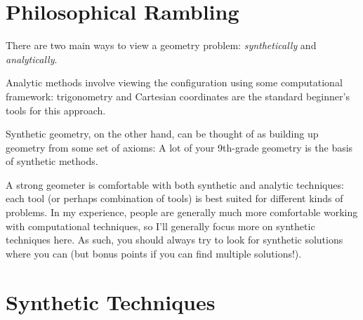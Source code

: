 \documentclass{scrartcl}
\begin{document}
\section{Philosophical Rambling}
There are two main ways to view a geometry problem:
\emph{synthetically} and \emph{analytically}.

Analytic methods involve viewing the configuration using
some computational framework: trigonometry and Cartesian coordinates
are the standard beginner's tools for this approach.

Synthetic geometry, on the other hand, can be thought of as building up
geometry from some set of axioms: A lot of your 9th-grade geometry
is the basis of synthetic methods.

A strong geometer is comfortable with both synthetic and analytic techniques:
each tool (or perhaps combination of tools) is best suited for different
kinds of problems. In my experience, people are generally much more comfortable
working with computational techniques, so I'll generally focus more on
synthetic techniques here. As such, you should always try to look for
synthetic solutions where you can
(but bonus points if you can find multiple solutions!).

\section{Synthetic Techniques}
\end{document}
